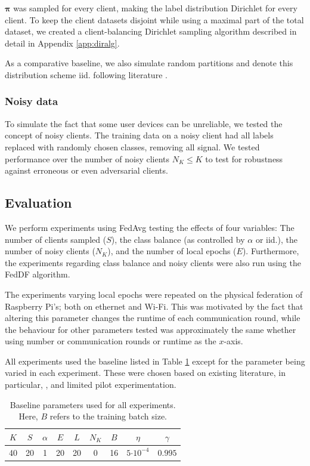 \documentclass{article}
\newcommand{\ctp}[1]{\ensuremath{\cdot10^{#1}}}
\begin{document}
$\bm\pi$ was sampled for every client, making the label distribution Dirichlet for every client.
To keep the client datasets disjoint while using a maximal part of the total dataset, we created a client-balancing Dirichlet sampling algorithm described in detail in Appendix \ref{app:diralg}.

As a comparative baseline, we also simulate random partitions and denote this distribution scheme iid. following literature \cite{lin2020ensemble}.

\subsubsection{Noisy data}
To simulate the fact that some user devices can be unreliable, we tested the concept of noisy clients.
The training data on a noisy client had all labels replaced with randomly chosen classes, removing all signal.
We tested performance over the number of noisy clients $N_K\leq K$ to test for robustness against erroneous or even adversarial clients.

\subsection{Evaluation}
We perform experiments using FedAvg testing the effects of four variables: The number of clients sampled ($S$), the class balance (as controlled by $\alpha$ or iid.), the number of noisy clients ($N_K$), and the number of local epochs ($E$).
Furthermore, the experiments regarding class balance and noisy clients were also run using the FedDF algorithm.

The experiments varying local epochs were repeated on the physical federation of Raspberry Pi's; both on ethernet and Wi-Fi.
This was motivated by the fact that altering this parameter changes the runtime of each communication round, while the behaviour for other parameters tested was approximately the same whether using number or communication rounds or runtime as the $x$-axis.

All experiments used the baseline listed in Table \ref{tab:baseline} except for the parameter being varied in each experiment.
These were chosen based on existing literature, in particular, \cite{mcmahan2017communication,lin2020ensemble}, and limited pilot experimentation.

\begin{table}[htb!]
    \centering
    \begin{tabular}{ccccccccc}
        $K$ & $S$ & $\alpha$ & $E$ & $L$ & $N_K$ & $B$ & $\eta$ & $\gamma$\\
        \hline
        40 & 20 & 1 & 20 & 20 & 0 & 16 & $5\ctp{-4}$ & $0.995$
    \end{tabular}
    \caption{Baseline parameters used for all experiments.
        Here, $B$ refers to the training batch size.}
    \label{tab:baseline}
\end{table}
\end{document}
